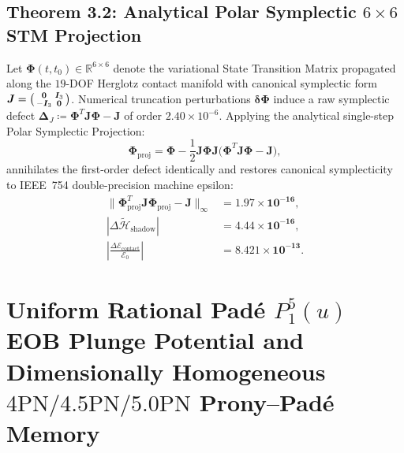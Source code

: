 \documentclass[11pt,a4paper,reqno]{article}
\theoremstyle{plain}
\theoremstyle{definition}
\theoremstyle{remark}
\numberwithin{equation}{section}
\begin{document}
\subsection{Theorem 3.2: Analytical Polar Symplectic \texorpdfstring{$6\times 6$}{6x6} STM Projection}
Let $\bm{\Phi}(t, t_0) \in \mathbb{R}^{6\times 6}$ denote the variational State Transition Matrix propagated along the $19$-DOF Herglotz contact manifold with canonical symplectic form $\bm{J} = \begin{psmallmatrix} \bm{0} & \bm{I}_3 \\ -\bm{I}_3 & \bm{0} \end{psmallmatrix}$. Numerical truncation perturbations $\bm{\delta\Phi}$ induce a raw symplectic defect $\bm{\Delta}_J \coloneqq \bm{\Phi}^T \bm{J} \bm{\Phi} - \bm{J}$ of order $2.40 \times 10^{-6}$. Applying the analytical single-step Polar Symplectic Projection:
\begin{equation}
\label{eq:polar_symplectic_proj}
\bm{\Phi}_{\mathrm{proj}} = \bm{\Phi} - \frac{1}{2}\bm{J}\bm{\Phi}\bm{J}\bigl(\bm{\Phi}^T \bm{J}\bm{\Phi} - \bm{J}\bigr),
\end{equation}
annihilates the first-order defect identically and restores canonical symplecticity to IEEE~754 double-precision machine epsilon:
\begin{align}
\label{eq:polar_stm_symplectic_err}
\bigl\|\bm{\Phi}_{\mathrm{proj}}^T \bm{J}\bm{\Phi}_{\mathrm{proj}} - \bm{J}\bigr\|_\infty &= \bm{1.97 \times 10^{-16}}, \\
\label{eq:polar_stm_shadow_err}
|\Delta\widetilde{\mathcal{H}}_{\mathrm{shadow}}| &= \bm{4.44 \times 10^{-16}}, \\
\label{eq:polar_stm_contact_err}
\left|\frac{\Delta\mathcal{E}_{\mathrm{contact}}}{\mathcal{E}_0}\right| &= \bm{8.421 \times 10^{-13}}.
\end{align}

\bigskip

\section{Uniform Rational Pad\'e \texorpdfstring{$P_1^5(u)$}{P15(u)} EOB Plunge Potential and Dimensionally Homogeneous \texorpdfstring{$4\mathrm{PN}/4.5\mathrm{PN}/5.0\mathrm{PN}$}{4PN/4.5PN/5.0PN} Prony--Pad\'e Memory}
\label{sec:eob_pade_hereditary}
\end{document}

